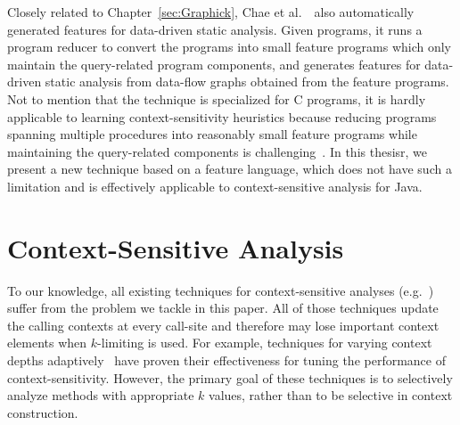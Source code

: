 Closely related to Chapter~\ref{sec:Graphick}, Chae et al.~\cite{ChOhHeYa17}~also automatically generated features for data-driven static analysis.
Given programs, it runs a program reducer to convert the programs into small feature programs which only maintain the query-related program components,
and generates features for data-driven static analysis from data-flow graphs obtained from the feature programs.
Not to mention that the technique is specialized for C programs, it is hardly applicable to learning context-sensitivity heuristics because reducing programs spanning multiple procedures into reasonably small feature programs while maintaining the query-related components is challenging~\cite{ChOhHeYa17}. In this thesisr, we present a new technique based on a feature language, which does not have such a limitation and is effectively applicable to context-sensitive analysis for Java.




\section{Context-Sensitive Analysis} To our knowledge, all
existing techniques for context-sensitive analyses
(e.g.~\cite{Sharir1981,Milanova2002,Shivers1988,
  Whaley2004,Milanova2005,Smaragdakis2011, Khedker2008,
  Karkare2007,WeiR15,Smaragdakis2014,JeJeChOh17,Oh2014,TanLX16,PadhyeK13})
suffer from the problem we tackle in this paper. All of those
techniques update the calling contexts at every call-site and
therefore may lose important context elements when $k$-limiting is used.  For example,
techniques for varying context depths
adaptively~\cite{WeiR15,JeJeChOh17,Oh2014, Smaragdakis2014} have proven
their effectiveness for tuning the performance of context-sensitivity.  However,
the primary goal of these techniques is to selectively analyze methods
with appropriate $k$ values, rather than to be selective in context
construction.


